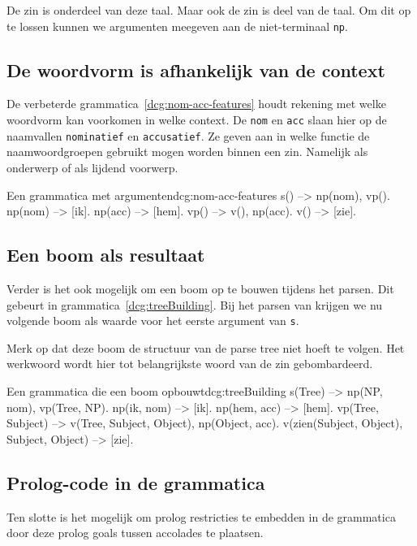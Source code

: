 De zin  is onderdeel van deze taal. Maar ook de zin  is deel van de taal. Om dit op te lossen kunnen we argumenten meegeven aan de niet-terminaal \texttt{np}.

\subsection{De woordvorm is afhankelijk van de context}
De verbeterde grammatica~\ref{dcg:nom-acc-features} houdt rekening met welke woordvorm kan voorkomen in welke context. De \texttt{nom} en \texttt{acc} slaan hier op de naamvallen \texttt{nominatief} en \texttt{accusatief}. Ze geven aan in welke functie de naamwoordgroepen gebruikt mogen worden binnen een zin. Namelijk als onderwerp of als lijdend voorwerp.

\begin{dcg}{Een grammatica met argumenten}{dcg:nom-acc-features}
s() --> np(nom), vp().
np(nom) --> [ik].
np(acc) --> [hem].
vp() --> v(), np(acc).
v() --> [zie].
\end{dcg}

\subsection{Een boom als resultaat}
Verder is het ook mogelijk om een boom op te bouwen tijdens het parsen. Dit gebeurt in grammatica~\ref{dcg:treeBuilding}. Bij het parsen van  krijgen we nu volgende boom als waarde voor het eerste argument van \texttt{s}.


Merk op dat deze boom de structuur van de parse tree niet hoeft te volgen. Het werkwoord wordt hier tot belangrijkste woord van de zin gebombardeerd.
\begin{dcg}{Een grammatica die een boom opbouwt}{dcg:treeBuilding}
s(Tree) --> np(NP, nom), vp(Tree, NP).
np(ik, nom) --> [ik].
np(hem, acc) --> [hem].
vp(Tree, Subject) --> v(Tree, Subject, Object), np(Object, acc).
v(zien(Subject, Object), Subject, Object) --> [zie].
\end{dcg} 

\subsection{Prolog-code in de grammatica}
Ten slotte is het mogelijk om prolog restricties te embedden in de grammatica door deze prolog goals tussen accolades te plaatsen.

